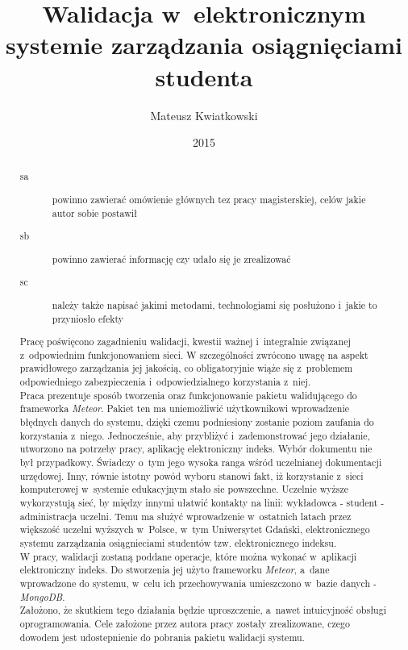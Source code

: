 \documentclass{xmgr}
\author   {Mateusz Kwiatkowski}
\title    {Walidacja w~elektronicznym systemie zarządzania osiągnięciami studenta}
\date     {2015}
\begin{document}
\begin{abstract}

\begin{description}
\item[sa] \textcolor{sa}{powinno zawierać omówienie głównych
tez pracy magisterskiej, celów jakie autor sobie postawił}
\item[sb] \textcolor{sb}{powinno zawierać informację czy udało
  się je zrealizować}
\item[sc] \textcolor{sc}{należy także napisać jakimi metodami,
  technologiami się posłużono i~jakie to przyniosło efekty}
\end{description}

\indent \indent \textcolor{sa}{Pracę poświęcono zagadnieniu walidacji, kwestii ważnej i~integralnie związanej z~odpowiednim funkcjonowaniem sieci.
W szczególności zwrócono uwagę na aspekt prawidłowego zarządzania jej jakością, co obligatoryjnie wiąże się z~problemem
odpowiedniego zabezpieczenia i~odpowiedzialnego korzystania z~niej.}
\\
\indent \textcolor{sa}{Praca prezentuje sposób tworzenia oraz funkcjonowanie pakietu walidującego do frameworka \textit{Meteor}. Pakiet ten
ma uniemożliwić użytkownikowi wprowadzenie błędnych danych do systemu, dzięki czemu podniesiony zostanie poziom zaufania
do korzystania z~niego. Jednocześnie, aby przybliżyć i~zademonstrować jego działanie, utworzono na potrzeby pracy, aplikację elektroniczny indeks.
Wybór dokumentu nie był przypadkowy. Świadczy o~tym jego wysoka ranga wśród uczelnianej dokumentacji urzędowej. Inny, równie istotny powód
wyboru stanowi fakt, iż korzystanie z~sieci komputerowej w~systemie edukacyjnym stało sie powszechne. Uczelnie wyższe wykorzystują sieć, by
między innymi ułatwić kontakty na linii: wykładowca - student - administracja uczelni.  Temu ma służyć wprowadzenie w~ostatnich latach przez
większość uczelni wyższych w~Polsce, w~tym Uniwersytet Gdański, elektronicznego systemu zarządzania osiągnieciami studentów
tzw. elektronicznego indeksu.}
\\
\indent \textcolor{sc}{W pracy, walidacji zostaną poddane operacje, które można wykonać w~aplikacji elektroniczny indeks. Do stworzenia jej użyto frameworku \textit{Meteor}, a~dane wprowadzone do systemu, w~celu ich przechowywania umieszczono w~bazie danych - \textit{MongoDB}.}
\\
\indent \textcolor{sb}{Założono, że skutkiem tego działania będzie uproszczenie, a~nawet intuicyjność obsługi oprogramowania. Cele założone przez autora pracy zostały zrealizowane, czego dowodem jest udostepnienie do pobrania pakietu walidacji systemu.}

\end{abstract}
\end{document}
